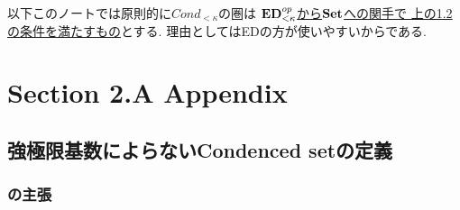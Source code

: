 \documentclass[dvipdfmx,a4paper,11pt]{article}
\theoremstyle{definition}
\begin{document}
以下このノートでは原則的に$Cond_{<\kappa}$の圏は
\underline{${\bf ED}_{< \kappa}^{op}$から${\bf Set}$への関手で 
上の1.2の条件を満たすもの}とする. 理由としてはEDの方が使いやすいからである.
\newpage

\section{Section 2.A Appendix }

\subsection{強極限基数によらないCondenced setの定義}

\subsubsection{\cite[Proposition 2.9]{Sch19}の主張}
\end{document}
